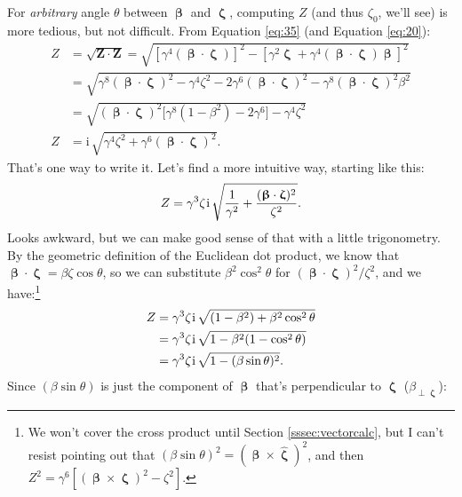 \documentclass[12pt]{article}
\renewcommand{\vv}[1]{\mathbf{#1}}
\newcommand{\vvbeta}{\bm{\upbeta}}
\newcommand{\vvzeta}{\bm{\upzeta}}
\newcommand{\hatzeta}{\bm{\hat{\upzeta}}}
\begin{document}
For \emph{arbitrary} angle $\theta$ between $\vvbeta$ and $\vvzeta$, computing $Z$ (and thus $\zeta_0$, we'll see) is more tedious, but not difficult. From Equation \ref{eq:35} (and Equation \ref{eq:20}):
\begin{equation}\label{eq:pa2}
\begin{split}
Z &= \sqrt{\vv Z \cdot \vv Z} = \sqrt{ \left[ \gamma^4 (\vvbeta \cdot \vvzeta) \right]^2 - \left[ \gamma^2 \vvzeta + \gamma^4 (\vvbeta \cdot \vvzeta) \vvbeta \right]^2}\\[2pt]
&= \sqrt{\gamma^8(\vvbeta \cdot \vvzeta)^2 - \gamma^4 \zeta^2 - 2\gamma^6 (\vvbeta \cdot \vvzeta)^2 - \gamma^8 (\vvbeta \cdot \vvzeta)^2 \beta^2 }\\[2pt]
&= \sqrt{(\vvbeta \cdot \vvzeta)^2 \Big[ \gamma^8 (1 - \beta^2) - 2\gamma^6 \Big] - \gamma^4 \zeta^2} \\[2pt]
Z &= \mathrm{i} \, \sqrt{\gamma^4 \zeta^2 + \gamma^6 (\vvbeta \cdot \vvzeta)^2} .
\end{split}
\end{equation}
That's one way to write it. Let's find a more intuitive way, starting like this:
\begin{equation*}
Z = \gamma^3 \zeta \mkern1mu \mathrm{i} \, \sqrt{\frac{1}{\gamma^2} + \frac{(\vvbeta \cdot \vvzeta)^2}{\zeta^2}}.
\end{equation*}
Looks awkward, but we can make good sense of that with a little trigonometry. By the geometric definition of the Euclidean dot product, we know that $\vvbeta \cdot \vvzeta = \beta \zeta \cos{\theta}$, so we can substitute $\beta^2 \cos^2{\theta}$ for $(\vvbeta \cdot \vvzeta)^2 / \zeta^2$, and we have:\footnote{\label{fn:crossacc}We won't cover the cross product until Section \ref{sssec:vectorcalc}, but I can't resist pointing out that $(\beta \sin{\theta})^2 = (\vvbeta \times \hatzeta)^2$, and then $Z^2 = \gamma^6 [(\vvbeta \times \vvzeta)^2 - \zeta^2]$.}
\begin{equation*}
\begin{split}
Z &= \gamma^3 \zeta \mkern1mu \mathrm{i} \, \sqrt{(1 - \beta^2) + \beta^2 \cos^2{\theta}}\\
&= \gamma^3 \zeta \mkern1mu \mathrm{i} \, \sqrt{ 1 - \beta^2 (1 - \cos^2{\theta})}\\
&= \gamma^3 \zeta \mkern1mu \mathrm{i} \, \sqrt{1 - (\beta \sin{\theta})^2}.
\end{split}
\end{equation*}
Since $(\beta \sin{\theta})$ is just the component of $\vvbeta$ that's perpendicular to $\vvzeta$ ($\beta_{\perp \vvzeta}$):
\end{document}
